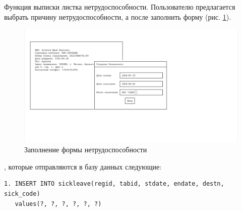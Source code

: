 \documentclass[14pt,a4paper,russian]{extreport}
\begin{document}
Функция выписки листка нетрудоспособности. Пользователю предлагается выбрать причину нетрудоспособности, а после заполнить форму (рис. \ref{fig:sickleave-issue}).\par
\begin{figure}[h!]
        \includegraphics[width=\textwidth]{prog_int/sickleave-issue}
        \caption{Заполнение формы нетрудоспособности}
        \label{fig:sickleave-issue}
\end{figure}
, которые отправляются в базу данных следующие: 
\begin{lstlisting}[style=csql] 
1. INSERT INTO sickleave(regid, tabid, stdate, endate, destn, sick_code)
   values(?, ?, ?, ?, ?, ?)
\end{lstlisting}
\end{document}
